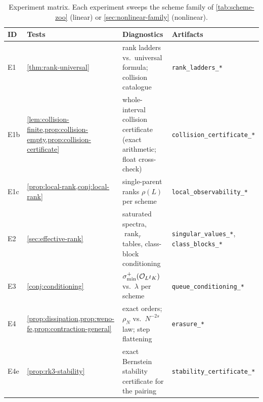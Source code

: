 \documentclass[pdflatex,sn-mathphys-num]{sn-jnl}%
\theoremstyle{thmstyleone}%
\theoremstyle{thmstyletwo}%
\theoremstyle{thmstylethree}%
\DeclareMathOperator{\rank}{rank}
\newcommand{\OL}{{\cal O}_L}
\begin{document}
\begin{table}[htbp]
\centering
\caption{Experiment matrix.
Each experiment sweeps the scheme family of \cref{tab:scheme-zoo} (linear) or \cref{sec:nonlinear-family} (nonlinear).}
\label{tab:experiment-matrix}
\begin{tabular}{@{}l
>{\raggedright\arraybackslash}p{88pt}
>{\raggedright\arraybackslash}p{190pt}
>{\raggedright\arraybackslash}p{102pt}@{}}
\toprule
ID  & Tests                                                                       & Diagnostics                                                                                                       & Artifacts                                                 \\
\midrule
E1  & \cref{thm:rank-universal}                                                   & rank ladders vs.\ universal formula; collision catalogue                                                          & \texttt{rank\_ladders\_*}                                 \\
E1b & \cref{lem:collision-finite,prop:collision-empty,prop:collision-certificate} & whole-interval collision certificate (exact arithmetic; float cross-check)                                        & \texttt{collision\_certificate\_*}                        \\
E1c & \cref{prop:local-rank,conj:local-rank}                                      & single-parent ranks $\rho(L)$ per scheme                                                                          & \texttt{local\_observability\_*}                          \\
E2  & \cref{sec:effective-rank}                                                   & saturated spectra, $\rank_\tau$ tables, class-block conditioning                                                  & \texttt{singular\_values\_*}, \texttt{class\_blocks\_*}   \\
E3  & \cref{conj:conditioning}                                                    & $\sigma^{+}_{\min}(\OL\iota_K)$ vs.\ $\lambda$ per scheme                                                         & \texttt{queue\_conditioning\_*}                           \\
E4  & \cref{prop:dissipation,prop:weno-fe,prop:contraction-general}               & exact orders; $\rho_N$ vs.\ $N^{-2s}$ law; step flattening                                                        & \texttt{erasure\_*}                                       \\
E4e & \cref{prop:rk3-stability}                                                   & exact Bernstein stability certificate for the pairing                                                             & \texttt{stability\_certificate\_*}                        \\

\end{tabular}
\end{table}
\end{document}

